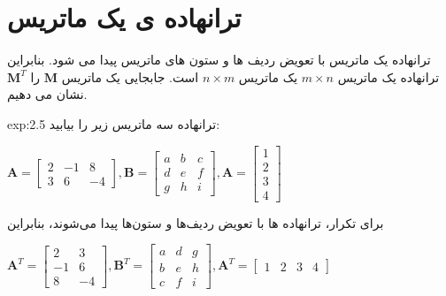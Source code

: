\section{\textbf{ترانهاده ی یک ماتریس}}
\label{sec:2.3}
{
    \Large
    \begin{spacing}{1.5}
        ترانهاده یک ماتریس با تعویض ردیف ها و ستون های ماتریس پیدا می شود.
        بنابراین ترانهاده یک ماتریس $m\times n$ یک ماتریس $n\times m$ است.
        جابجایی یک ماتریس $\textbf{M}$ را $\textbf{M}^T$ نشان می دهیم.

        \begin{example}{exp:2.5}
            \Large
            ترانهاده سه ماتریس زیر را بیابید:

            \begin{center}
                $\textbf{A}=\begin{bmatrix}
                                2 & -1 & 8  \\
                                3 & 6  & -4
                \end{bmatrix}, \textbf{B}=\begin{bmatrix}
                                              a & b & c \\
                                              d & e & f \\
                                              g & h & i
                \end{bmatrix}, \textbf{A}=\begin{bmatrix}
                                              1 \\
                                              2 \\
                                              3 \\
                                              4
                \end{bmatrix}$
            \end{center}

            برای تکرار، ترانهاده ها با تعویض ردیف‌ها و ستون‌ها پیدا می‌شوند، بنابراین

            \begin{center}
                $\textbf{A}^T=\begin{bmatrix}
                                  2  & 3  \\
                                  -1 & 6  \\
                                  8  & -4
                \end{bmatrix}, \textbf{B}^T=\begin{bmatrix}
                                                a & d & g \\
                                                b & e & h \\
                                                c & f & i
                \end{bmatrix}, \textbf{A}^T=\begin{bmatrix}
                                                1 & 2 & 3 & 4
                \end{bmatrix}$
            \end{center}


\end{example}
\end{spacing}}
